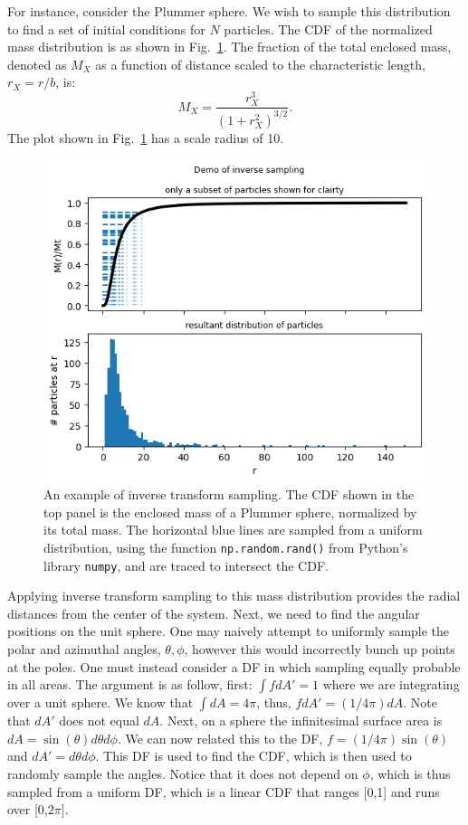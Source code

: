 For instance, consider the Plummer sphere. We wish to sample this distribution to find a set of initial conditions for $N$ particles. The CDF of the normalized mass distribution is as shown in Fig.~\ref{fig:inverse-transform-sampling}. The fraction of the total enclosed mass, denoted as $M_X$ as a function of distance scaled to the characteristic length, $r_X = r/b$, is:
\begin{equation}
    M_X = \frac{r_X^3}{\left(1+r_X^2 \right)^{3/2}}.
\end{equation}
The plot shown in Fig.~\ref{fig:inverse-transform-sampling} has a scale radius of 10. 

\begin{figure}
    \centering
    \includegraphics[width=0.75\linewidth]{images/inverse-transform-sampling.png}
    \caption{An example of inverse transform sampling. The CDF shown in the top panel is the enclosed mass of a Plummer sphere, normalized by its total mass. The horizontal blue lines are sampled from a uniform distribution, using the function \texttt{np.random.rand()} from Python's  library \texttt{numpy}, and are traced to intersect the CDF. }
    \label{fig:inverse-transform-sampling}
\end{figure}

Applying inverse transform sampling to this mass distribution provides the radial distances from the center of the system. Next, we need to find the angular positions on the unit sphere. One may naively attempt to uniformly sample the polar and azimuthal angles, $\theta,\phi$, however this would incorrectly bunch up points at the poles. One must instead consider a DF in which sampling equally probable in all areas. The argument is as follow, first: $\int f dA' = 1$ where we are integrating over a unit sphere. We know that $\int dA = 4\pi$, thus, $f dA' = (1/4\pi) dA$. Note that $dA'$ does not equal $dA$. Next, on a sphere the infinitesimal surface area is $dA = \sin(\theta)d\theta d\phi$. We can now related this to the DF, $f=(1/4\pi)\sin(\theta)$ and $dA' =d\theta d\phi$. This DF is used to find the CDF, which is then used to randomly sample the angles. Notice that it does not depend on $\phi$, which is thus sampled from a uniform DF, which is a linear CDF that ranges [0,1] and runs over [0,$2\pi$].

